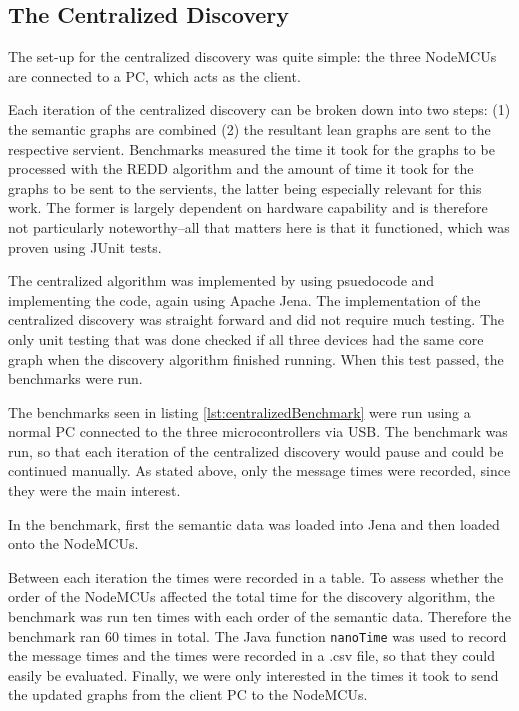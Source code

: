 \subsection{The Centralized Discovery}

The set-up for the centralized discovery was quite simple: the three NodeMCUs are connected to a PC, which acts as the client.

Each iteration of the centralized discovery can be broken down into two steps: (1) the semantic graphs are combined (2) the resultant lean graphs are sent to the respective servient. Benchmarks measured the time it took for the graphs to be processed with the REDD algorithm and the amount of time it took for the graphs to be sent to the servients, the latter being especially relevant for this work. The former is largely dependent on hardware capability and is therefore not particularly noteworthy--all that matters here is that it functioned, which was proven using JUnit tests.

The centralized algorithm was implemented by using psuedocode and implementing the code, again using Apache Jena. The implementation of the centralized discovery was straight forward and did not require much testing. The only unit testing that was done checked if all three devices had the same core graph when the discovery algorithm finished running. When this test passed, the benchmarks were run.




The benchmarks seen in listing \ref{lst:centralizedBenchmark} were run using a normal PC connected to the three microcontrollers via USB. The benchmark was run, so that each iteration of the centralized discovery would pause and could be continued manually. As stated above, only the message times were recorded, since they were the main interest.

In the benchmark, first the semantic data was loaded into Jena and then loaded onto the NodeMCUs. 

Between each iteration the times were recorded in a table. To assess whether the order of the NodeMCUs affected the total time for the discovery algorithm, the benchmark was run ten times with each order of the semantic data. Therefore the benchmark ran 60 times in total. The Java function \texttt{nanoTime} was used to record the message times and the times were recorded in a .csv file, so that they could easily be evaluated. Finally, we were only interested in the times it took to send the updated graphs from the client PC to the NodeMCUs.



